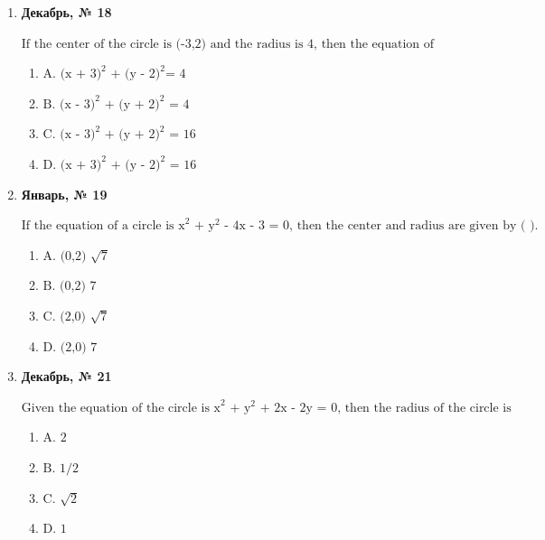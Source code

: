 \begin{enumerate}
\begin{enumerate}
\end{enumerate}
\item \textbf{Декабрь, № 18} \par \smallskip
$\displaystyle \text{If the center of the circle is (-3,2) and the radius is 4, then the equation of the circle is}$
\begin{enumerate}
\item $\displaystyle \text{A. (x + 3)}^{2}\text{ + (y - 2)}^{2}\text{= 4}$
\item $\displaystyle \text{B. (x - 3)}^{2}\text{ + (y + 2)}^{2}\text{ = 4}$
\item $\displaystyle \text{C. (x - 3)}^{2}\text{ + (y + 2)}^{2}\text{ = 16}$
\item $\displaystyle \text{D. (x + 3)}^{2}\text{ + (y - 2)}^{2}\text{ = 16}$
\end{enumerate}
\item \textbf{Январь, № 19} \par \smallskip
$\displaystyle \text{If the equation of a circle is x}^{2}\text{ + y}^{2}\text{ - 4x - 3 = 0, then the center and radius are given by ( ).}$
\begin{enumerate}
\item $\displaystyle \text{A. (0,2)  }\sqrt{7}$
\item $\displaystyle \text{B. (0,2)  7}$
\item $\displaystyle \text{C. (2,0)  }\sqrt{7}$
\item $\displaystyle \text{D. (2,0)  7}$
\end{enumerate}
\item \textbf{Декабрь, № 21} \par \smallskip
$\displaystyle \text{Given the equation of the circle is x}^{2}\text{ + y}^{2}\text{ + 2x - 2y = 0, then the radius of the circle is}$
\begin{enumerate}
\item $\displaystyle \text{A. 2}$
\item $\displaystyle \text{B. 1/2}$
\item $\displaystyle \text{C. }\sqrt{2}$
\item $\displaystyle \text{D. 1}$
\end{enumerate}
\end{enumerate}

